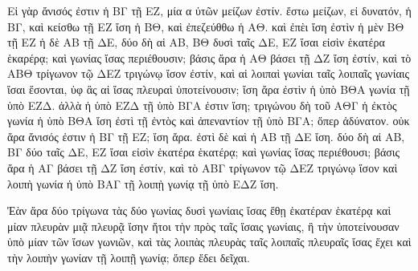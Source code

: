 \begin{Parallel}{}{}
{{\greekfont Εἰ γὰρ ἄνισός ἐστιν ἡ ΒΓ τῇ ΕΖ, μία α ὐτῶν μείζων ἐστίν. ἔστω μείζων, εἰ δυνατόν, ἡ ΒΓ, καὶ κείσθω τῇ ΕΖ ἴση ἡ ΒΘ, καὶ ἐπεζεύθθω ἡ ΑΘ. καὶ ἐπὲι ἴση ἐστὶν ἡ μὲν ΒΘ τῇ ΕΖ ἡ δὲ ΑΒ τῇ ΔΕ, δύο δὴ αἱ ΑΒ, ΒΘ δυσὶ ταῖς ΔΕ, ΕΖ ἴσαι εἰσὶν ἑκατέρα ἑκαρέρᾳ; καὶ γωνίας ἴσας περιέθουσιν; βάσις ἄρα ἡ ΑΘ βάσει τῇ ΔΖ ἴση ἐστίν, καὶ τὸ ΑΒΘ τρίγωνον τῷ ΔΕΖ τριγώνῳ ἴσον ἐστίν, καὶ αἱ λοιπαὶ γωνίαι ταῖς λοιπαῖς γωνίαις ἴσαι ἔσονται, ὑφ ἃς αἱ ἴσας πλευραὶ ὑποτείνουσιν;
 ἴση ἄρα ἐστὶν ἡ ὑπὸ ΒΘΑ γωνία τῇ ὑπὸ ΕΖΔ.
ἀλλὰ ἡ ὑπὸ ΕΖΔ τῇ ὑπὸ ΒΓΑ ἐστιν ἴση; τριγώνου δὴ τοῦ ΑΘΓ ἡ ἐκτὸς γωνία ἡ ὑπὸ ΒΘΑ ἴση ἐστὶ τῇ ἐντὸς καὶ ἀπεναντίον
τῇ ὑπὸ ΒΓΑ; ὅπερ ἀδύνατον. οὐκ ἄρα ἄνισός ἐστιν ἡ ΒΓ τῇ ΕΖ; ἴση ἄρα. ἐστὶ δὲ καὶ ἡ ΑΒ τῇ ΔΕ ἴση. δύο δὴ αἱ ΑΒ, ΒΓ δύο ταῖς ΔΕ, ΕΖ ἴσαι εἰσὶν ἑκατέρα ἑκατέρᾳ; καὶ γωνίας ἴσας περιέθουσι; βάσις ἄρα ἡ ΑΓ βάσει τῇ ΔΖ ἴση ἐστίν, καὶ τὸ ΑΒΓ τρίγωνον τῷ ΔΕΖ τριγώνῳ ἴσον καὶ λοιπὴ γωνία ἡ ὑπὸ ΒΑΓ τῇ λοιπῂ γωνίᾳ τῇ ὑπὸ ΕΔΖ ἴση.}

{\greekfont Ἐὰν ἄρα δύο τρίγωνα τὰς δύο γωνίας δυσὶ γωνίαις ἴσας ἔθῃ ἑκατέραν
ἑκατέρᾳ καὶ μίαν πλευρὰν μιᾷ πλευρᾷ ἴσην ἤτοι τὴν πρὸς ταῖς ἴσαις γωνίαις, ἢ τὴν ὑποτείνουσαν ὑπὸ μίαν τῶν ἴσων γωνιῶν, καὶ τὰς λοιπὰς πλευρὰς ταῖς λοιπαῖς πλευραῖς ἴσας ἕχει 
καὶ τὴν λοιπὴν γωνίαν τῇ λοιπῇ γωνίᾳ; ὅπερ ἔδει δεῖχαι.}}

\end{Parallel}
